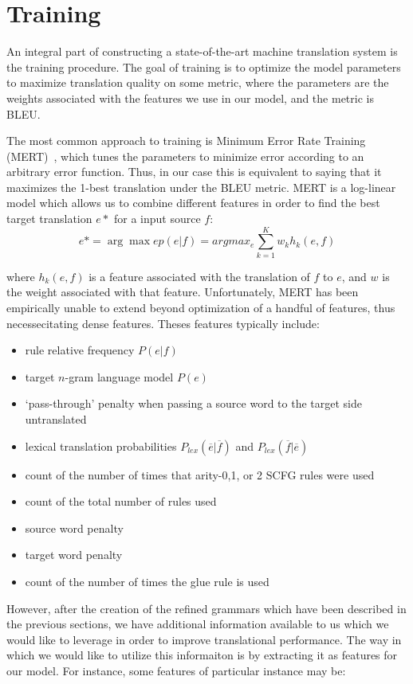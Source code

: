 \chapter{Training}

An integral part of constructing a state-of-the-art machine translation system is the training procedure. The goal of training is to optimize the model parameters to maximize translation quality on some metric, where the parameters are the weights associated with the features we use in our model, and the metric is BLEU. 

The most common approach to training is Minimum Error Rate Training (MERT)~\cite{och:03}, which tunes the parameters to minimize error according to an arbitrary error function. Thus, in our case this is equivalent to saying that it maximizes the 1-best translation under the BLEU metric. MERT is a log-linear model which allows us to combine different features in order to find the best target translation $e*$ for a input source $f$:
$$e* = \arg\max e p(e|f) = argmax_e \sum_{k=1}^K w_kh_k(e,f)$$

where $h_k(e,f)$ is a feature associated with the translation of $f$ to $e$, and $w$ is the weight associated with that feature. Unfortunately, MERT has been empirically unable to extend beyond optimization of a handful of features, thus necessecitating dense features. Theses features typically include:

\begin{itemize}
\item rule relative frequency $P(e|f)$
\item target $n$-gram language model $P(e)$
\item `pass-through' penalty when passing a source word to the target side untranslated
\item lexical translation probabilities $P_{lex}(\overline{e}|\overline{f})$ and $P_{lex}(\overline{f}|\overline{e})$
\item count of the number of times that arity-0,1, or 2 SCFG rules were used 
\item count of the total number of rules used
\item source word penalty
\item target word penalty
\item count of the number of times the glue rule is used 
\end{itemize} 

However, after the creation of the refined grammars which have been described in the previous sections, we have additional information available to us which we would like to leverage in order to improve translational performance. The way in which we would like to utilize this informaiton is by extracting it as features for our model. For instance, some features of particular instance may be:

